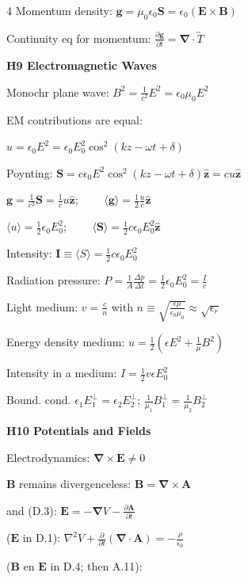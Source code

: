 \documentclass[a4paper,twoside]{article}
\newcommand{\secblock}[1]{%
\par\vspace{1.8pt}%
\noindent\colorbox{hdrcol}{\parbox[c][1.0em][c]{0.98\linewidth}{\color{white}\bfseries\small #1}}\par
\vspace{1pt}%
}
\begin{document}
\begin{multicols*}{4}
Momentum density: 
\(\bm g =  \mu_0 \epsilon_0 \bm S = \epsilon_0 (\bm E \times \bm B)\)


Continuity eq for momentum:
\(\frac{\partial \bm g}{\partial t} = \bm \nabla \cdot \overleftrightarrow{T} \)


\secblock{H9 Electromagnetic Waves}


Monochr plane wave:
\(B^2 = \frac{1}{c^2} E^2 = \epsilon_0 \mu_0 E^2\)

EM contributions are equal:

\(u = \epsilon_0 E^2 = \epsilon_0 E_0^2 \cos^2(k z - \omega t + \delta)\)

Poynting:
\(\bm S = c \epsilon_0 E^2 \cos^2(k z - \omega t + \delta) \hat{\bm z} = c u \hat{\bm z}\)

\(\bm g = \frac{1}{c^2} \bm S = \frac{1}{c} u \hat{\bm z}\);
\(\qquad \langle \bm g \rangle = \frac{1}{2} \frac{u}{c} \hat{\bm z}\)

\(\langle u \rangle = \frac{1}{2} \epsilon_0 E_0^2\);
\(\qquad \langle \bm S \rangle = \frac{1}{2} c \epsilon_0 E_0^2 \hat{\bm z}\)

Intensity: \(\bm I \equiv \langle  S \rangle = \frac{1}{2} c \epsilon_0 E_0^2 \)

Radiation pressure:
\(P = \frac{1}{A}\frac{\Delta p}{\Delta t} = \frac{1}{2}\epsilon_0 E_0^2 =\frac{I}{c}\)

Light medium:
\(v = \frac{c}{n}\)
with \(n \equiv \sqrt{\frac{\epsilon \mu}{\epsilon_0 \mu_0}} \approx \sqrt{\epsilon_r}\)

Energy density medium:
\(u = \frac{1}{2} (\epsilon E^2 + \frac{1}{\mu} B^2)\)

Intensity in a medium:
\(I = \frac{1}{2} v \epsilon E_0^2 \)

Bound. cond.
\(\epsilon_1 E_1^{\perp} = \epsilon_2 E_2^{\perp}\);
\(\frac{1}{\mu_1} B_1^{\perp} = \frac{1}{\mu_2} B_2^{\perp}\)

\secblock{H10 Potentials and Fields}

Electrodynamics: \(\bm \nabla \times \bm E \neq 0\)

\(\bm B\) remains divergenceless:
\(\bm B = \bm \nabla \times \bm A\)

and (D.3): \(\bm E = - \bm \nabla V - \frac{\partial \bm A}{\partial t}\) 

(\(\bm E\) in D.1):
\(\nabla^2 V + \frac{\partial }{\partial t}(\bm \nabla \cdot \bm A) = -\frac{\rho}{\epsilon_0}\)

(\(\bm B\) en \(\bm E\) in D.4; then A.11):


\end{multicols*}
\end{document}
